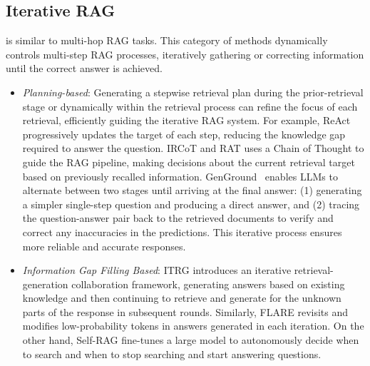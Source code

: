 \subsection{Iterative RAG}


\MFUsentencecase{\secondlevel} is similar to multi-hop RAG tasks. This category of methods dynamically controls multi-step RAG processes, iteratively gathering or correcting information until the correct answer is achieved.


\begin{itemize}
    \item \textit{Planning-based}: Generating a stepwise retrieval plan during the prior-retrieval stage or dynamically within the retrieval process can refine the focus of each retrieval, efficiently guiding the iterative RAG system. For example, ReAct \cite{yao2022react} progressively updates the target of each step, reducing the knowledge gap required to answer the question. IRCoT \cite{trivedi-etal-2023-ircot} and RAT\cite{wang2024rat} uses a Chain of Thought to guide the RAG pipeline, making decisions about the current retrieval target based on previously recalled information. GenGround~\cite{shi2024generate} enables LLMs to alternate between two stages until arriving at the final answer: (1) generating a simpler single-step question and producing a direct answer, and (2) tracing the question-answer pair back to the retrieved documents to verify and correct any inaccuracies in the predictions. This iterative process ensures more reliable and accurate responses.
    \item \textit{Information Gap Filling Based}: ITRG \cite{feng2024retrieval} introduces an iterative retrieval-generation collaboration framework, generating answers based on existing knowledge and then continuing to retrieve and generate for the unknown parts of the response in subsequent rounds. Similarly, FLARE \cite{jiang2023active} revisits and modifies low-probability tokens in answers generated in each iteration. On the other hand, Self-RAG \cite{asai2023self} fine-tunes a large model to autonomously decide when to search and when to stop searching and start answering questions.
\end{itemize}



